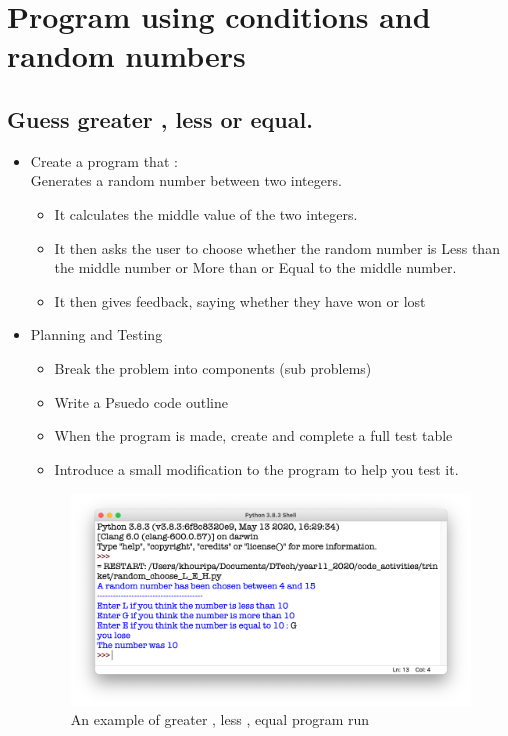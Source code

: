 \documentclass[a4paper,12pt]{article}
\begin{document}
\section{Program using conditions and random numbers}
\subsection{Guess greater , less or equal.}
\begin{itemize}
	\item Create a program that :\\
Generates a random number between two integers.
\begin{itemize}
	\item It calculates the middle value of the two integers.
	\item It then asks the user to choose whether the random  number is Less than the middle number or More than or Equal to the middle number.
	\item It then gives feedback, saying whether they have won or lost
\end{itemize}
\item{Planning and Testing}
\begin{itemize}
	\item Break the problem into components (sub problems)
	\item Write a Psuedo code outline
	\item When the program is made, create and complete a full test table
	\item Introduce a small modification to the program to help you test it.
\end{itemize}

\begin{figure} [!h]
	\centering
	\includegraphics[width=13cm]{screen_shots/random_choose_L_E_H.png}
	\caption*{An example of greater , less , equal  program run}
\end{figure}

\end{itemize}
\newpage
\end{document}
